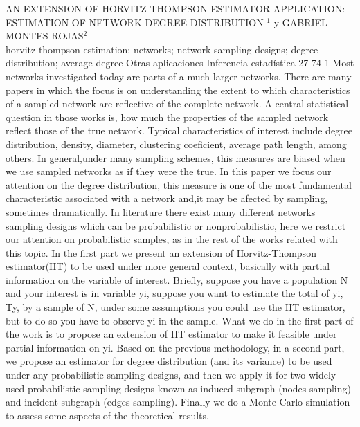 \A
{AN EXTENSION OF HORVITZ-THOMPSON ESTIMATOR APPLICATION: ESTIMATION OF NETWORK DEGREE DISTRIBUTION}
{$^1$ y GABRIEL MONTES ROJAS$^2$}
{
\\}
{horvitz-thompson estimation; networks; network sampling designs; degree distribution; average degree} 
 {Otras aplicaciones} 
 {Inferencia estadística} 
 {27} 
 {74-1}
{Most networks investigated today are parts of a much larger networks. There are many papers in which the focus is on understanding the extent to which characteristics of a sampled network are reflective of the complete network. A central statistical question in those works is, how much the properties of the sampled network reflect those of the true network. Typical characteristics of interest include degree distribution, density, diameter, clustering coeficient, average path length, among others. In general,under many sampling schemes, this measures are biased when we use sampled networks as if they were the true. In this paper we focus our attention on the degree distribution, this measure is one of the most fundamental characteristic associated with a network and,it may be afected by sampling, sometimes dramatically. In literature there exist many different networks sampling designs which can be probabilistic or nonprobabilistic, here we restrict our attention on probabilistic samples, as in the rest of the works related with this topic. In the first part we present an extension of Horvitz-Thompson estimator(HT) to be used under more general context, basically with partial information on the variable of interest. Briefly, suppose you have a population N and your interest is in variable yi, suppose you want to estimate the total of yi, Ty, by a sample of N, under some assumptions you could use the HT estimator, but to do so you have to observe yi in the sample. What we do in the first part of the work is to propose an extension of HT estimator to make it feasible under partial information on yi. Based on the previous methodology, in a second part, we propose an estimator for degree distribution (and its variance) to be used under any probabilistic sampling designs, and then we apply it for two widely used probabilistic sampling designs known as induced subgraph (nodes sampling) and incident subgraph (edges sampling). Finally we do a Monte Carlo simulation to assess some aspects of the theoretical results. }
